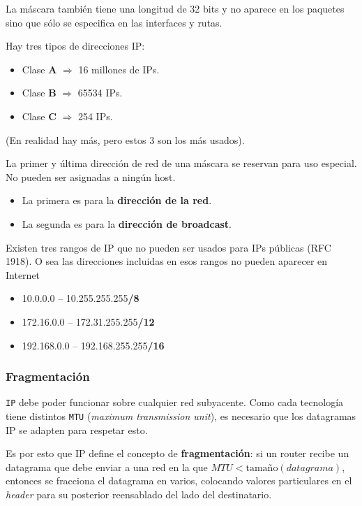 \documentclass[]{article}
\begin{document}
La máscara también tiene una longitud de 32 bits y no aparece en los paquetes sino que sólo se especifica en las interfaces y rutas.


Hay tres tipos de direcciones IP:
\begin{itemize}
    \item Clase \textbf{A} $\Rightarrow$ 16 millones de IPs.
    \item Clase \textbf{B} $\Rightarrow$ 65534 IPs.
    \item Clase \textbf{C} $\Rightarrow$ 254 IPs.
\end{itemize}

(En realidad hay más, pero estos 3 son los más usados).


La primer y última dirección de red de una máscara se reservan para uso especial. No pueden ser asignadas a ningún host.

\begin{itemize}
    \item La primera es para la \textbf{dirección de la red}.
    \item La segunda es para la \textbf{dirección de broadcast}.
\end{itemize}

Existen tres rangos de IP que no pueden ser usados para IPs públicas (RFC 1918). O sea las direcciones incluidas en esos rangos no pueden aparecer en Internet
\begin{itemize}
    \item 10.0.0.0 – 10.255.255.255\textbf{/8}
    \item 172.16.0.0 – 172.31.255.255\textbf{/12}
    \item 192.168.0.0 – 192.168.255.255\textbf{/16}
\end{itemize}

\subsubsection{Fragmentación}
\texttt{IP} debe poder funcionar sobre cualquier red subyacente. Como cada tecnología tiene distintos \texttt{MTU} (\emph{maximum transmission unit}), es necesario que los datagramas IP se adapten para respetar esto.

Es por esto que IP define el concepto de \textbf{fragmentación}: si un router recibe un datagrama que debe enviar a una red en la que $MTU < \text{tamaño}(datagrama)$, entonces se fracciona el datagrama en varios, colocando valores particulares en el \emph{header} para su posterior reensablado del lado del destinatario.
\end{document}
